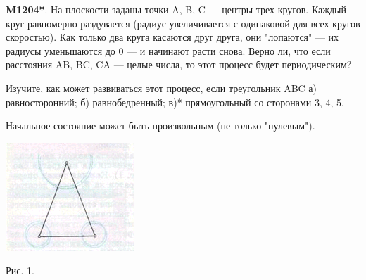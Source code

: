 

\begin{enumerate}
    \begin{minipage}[t]{0.35\linewidth}
        \textbf{M1204*}. На плоскости заданы точки A, B, C --- центры трех кругов. Каждый круг равномерно раздувается (радиус увеличивается с одинаковой для всех кругов скоростью). Как только два круга касаются друг друга, они "лопаются" --- их радиусы уменьшаются до 0 --- и начинают расти снова. Верно ли, что если расстояния AB, BC, CA --- целые числа, то этот процесс будет периодическим?

        Изучите, как может развиваться этот процесс, если треугольник ABC а) равносторонний; б) равнобедренный; в)* прямоугольный со сторонами 3, 4, 5.

        Начальное состояние может быть произвольным (не только "нулевым").

        \begin{minipage}[c]{\textwidth}
        \centering
            \includegraphics[width=\linewidth]{pic1.png}
            \caption{Рис. 1.}
            \label{fig:pic1}
        \end{minipage}


\end{minipage}
\end{enumerate}
